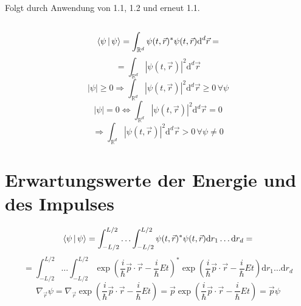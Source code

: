\documentclass[a4paper,11pt]{article}
\begin{document}
\subsection{}
Folgt durch Anwendung von 1.1, 1.2 und erneut 1.1.

\subsection{}
\begin{equation}
        \Braket{\psi|\psi} = \int_{\mathbb{R}^d}\psi(t,\vec{r})^*\psi(t,\vec{r})\text{d}^d\vec{r} =
\end{equation}
\begin{equation}
        = \int_{\mathbb{R}^d}|\psi(t,\vec{r})|^2\text{d}^d\vec{r}
\end{equation}
\begin{equation}
        |\psi|\geq 0 \Rightarrow \int_{\mathbb{R}^d}|\psi(t,\vec{r})|^2\text{d}^d\vec{r} \geq 0 \, \forall\psi
\end{equation}
\begin{equation}
        |\psi| = 0 \Leftrightarrow \int_{\mathbb{R}^d}|\psi(t,\vec{r})|^2\text{d}^d\vec{r} = 0
\end{equation}
\begin{equation}
        \Rightarrow \int_{\mathbb{R}^d}|\psi(t,\vec{r})|^2\text{d}^d\vec{r} > 0 \, \forall\psi \neq 0
\end{equation}
\section{Erwartungswerte der Energie und des Impulses}
\begin{equation}
        \Braket{\psi|\psi} = \int_{-L/2}^{L/2} \dotso \int_{-L/2}^{L/2} \psi(t,\vec{r})^*\psi(t,\vec{r}) \text{d}r_1 \dotso \text{d}r_d = 
\end{equation}
\begin{equation}
        = \int_{-L/2}^{L/2} \dotso \int_{-L/2}^{L/2} \exp(\frac{i}{\hbar}\vec{p}\cdot\vec{r} - \frac{i}{\hbar}Et)^*\exp(\frac{i}{\hbar}\vec{p}\cdot\vec{r} - \frac{i}{\hbar}Et) \text{d}r_1 \dotso \text{d}r_d
\end{equation}
\begin{equation}
        \label{bla}
        \nabla_{\vec{r}}\psi = \nabla_{\vec{r}} \exp(\frac{i}{\hbar}\vec{p}\cdot\vec{r} - \frac{i}{\hbar}Et) = \vec{p} \exp(\frac{i}{\hbar}\vec{p}\cdot\vec{r} - \frac{i}{\hbar}Et) = \vec{p}\psi
\end{equation}
\end{document}
